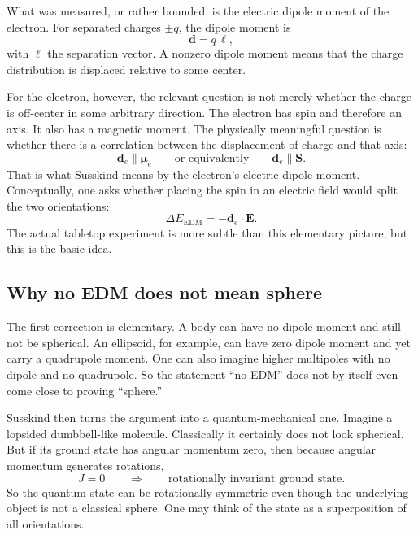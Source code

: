 What was measured, or rather bounded, is the electric dipole moment of the electron. For separated charges \(\pm q\), the dipole moment is
\begin{equation}
\mathbf d = q\,\boldsymbol{\ell},
\end{equation}
with \(\boldsymbol{\ell}\) the separation vector. A nonzero dipole moment means that the charge distribution is displaced relative to some center.

For the electron, however, the relevant question is not merely whether the charge is off-center in some arbitrary direction. The electron has spin and therefore an axis. It also has a magnetic moment. The physically meaningful question is whether there is a correlation between the displacement of charge and that axis:
\begin{equation}
\mathbf d_e \parallel \boldsymbol{\mu}_e
\qquad \text{or equivalently} \qquad
\mathbf d_e \parallel \mathbf S .
\end{equation}
That is what Susskind means by the electron's electric dipole moment. Conceptually, one asks whether placing the spin in an electric field would split the two orientations:
\begin{equation}
\Delta E_{\mathrm{EDM}}=-\mathbf d_e\cdot \mathbf E .
\end{equation}
The actual tabletop experiment is more subtle than this elementary picture, but this is the basic idea.

\subsection{Why no EDM does not mean sphere}

The first correction is elementary. A body can have no dipole moment and still not be spherical. An ellipsoid, for example, can have zero dipole moment and yet carry a quadrupole moment. One can also imagine higher multipoles with no dipole and no quadrupole. So the statement ``no EDM'' does not by itself even come close to proving ``sphere.''

Susskind then turns the argument into a quantum-mechanical one. Imagine a lopsided dumbbell-like molecule. Classically it certainly does not look spherical. But if its ground state has angular momentum zero, then because angular momentum generates rotations,
\begin{equation}
J=0 \qquad \Longrightarrow \qquad \text{rotationally invariant ground state.}
\end{equation}
So the quantum state can be rotationally symmetric even though the underlying object is not a classical sphere. One may think of the state as a superposition of all orientations.

